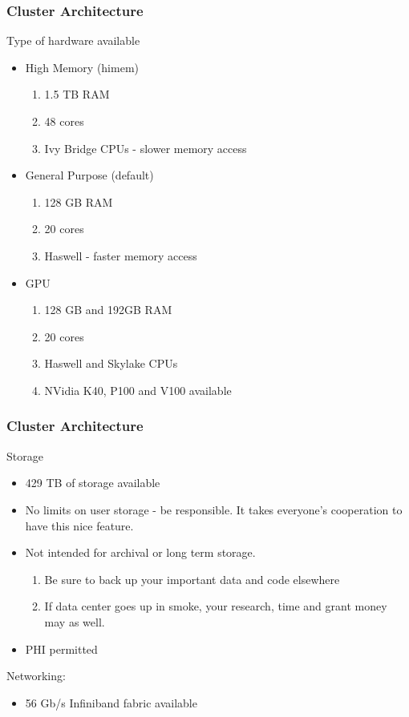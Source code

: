 \documentclass{beamer}
\begin{document}
\begin{frame}
\frametitle{Cluster Architecture}
Type of hardware available
\begin{itemize}
    \item High Memory (himem)
    \begin{enumerate}
        \item 1.5 TB RAM
        \item 48 cores 
        \item Ivy Bridge CPUs - slower memory access
    \end{enumerate}
    \bigskip
    \pause
    \item General Purpose (default)
    \begin{enumerate}
        \item 128 GB RAM
        \item 20 cores 
        \item Haswell - faster memory access
    \end{enumerate}
    \bigskip
    \pause
    \item GPU 
    \begin{enumerate}
        \item 128 GB and 192GB RAM 
        \item 20 cores 
        \item Haswell and Skylake CPUs
        \item NVidia K40, P100 and V100 available
    \end{enumerate}
\end{itemize}
\end{frame}


\begin{frame}
\frametitle{Cluster Architecture}
Storage 
\begin{itemize}
    \item 429 TB of storage available
    \pause
    \item No limits on user storage - be responsible.
          It takes everyone's cooperation to have this nice feature.
    \pause
    \item Not intended for archival or long term storage.
        \begin{enumerate}
              \item Be sure to back up your important data and code elsewhere
              \pause
              \item If data center goes up in smoke, your research, time and grant money may as well.
        \end{enumerate}
    \pause
    \item PHI permitted
\end{itemize}
\pause
Networking:
\begin{itemize}
    \item 56 Gb/s Infiniband fabric available
\end{itemize}
\end{frame}
\end{document}
